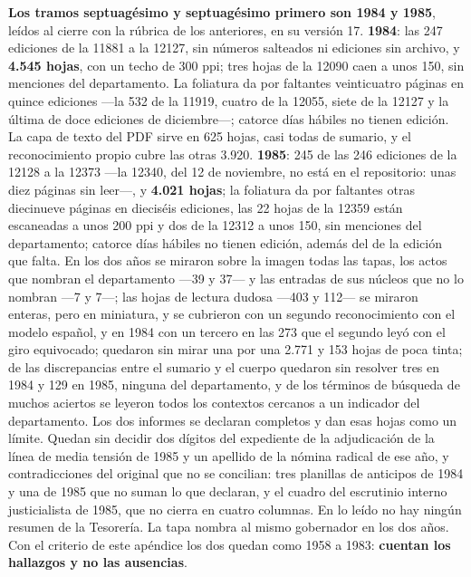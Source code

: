 \textbf{Los tramos septuagésimo y septuagésimo primero son 1984 y 1985}, leídos al cierre con la rúbrica de los anteriores, en su versión 17. \textbf{1984}: las 247 ediciones de la 11881 a la 12127, sin números salteados ni ediciones sin archivo, y \textbf{4.545 hojas}, con un techo de 300 ppi; tres hojas de la 12090 caen a unos 150, sin menciones del departamento. La foliatura da por faltantes veinticuatro páginas en quince ediciones ---la 532 de la 11919, cuatro de la 12055, siete de la 12127 y la última de doce ediciones de diciembre---; catorce días hábiles no tienen edición. La capa de texto del PDF sirve en 625 hojas, casi todas de sumario, y el reconocimiento propio cubre las otras 3.920. \textbf{1985}: 245 de las 246 ediciones de la 12128 a la 12373 ---la 12340, del 12 de noviembre, no está en el repositorio: unas diez páginas sin leer---, y \textbf{4.021 hojas}; la foliatura da por faltantes otras diecinueve páginas en dieciséis ediciones, las 22 hojas de la 12359 están escaneadas a unos 200 ppi y dos de la 12312 a unos 150, sin menciones del departamento; catorce días hábiles no tienen edición, además del de la edición que falta. En los dos años se miraron sobre la imagen todas las tapas, los actos que nombran el departamento ---39 y 37--- y las entradas de sus núcleos que no lo nombran ---7 y 7---; las hojas de lectura dudosa ---403 y 112--- se miraron enteras, pero en miniatura, y se cubrieron con un segundo reconocimiento con el modelo español, y en 1984 con un tercero en las 273 que el segundo leyó con el giro equivocado; quedaron sin mirar una por una 2.771 y 153 hojas de poca tinta; de las discrepancias entre el sumario y el cuerpo quedaron sin resolver tres en 1984 y 129 en 1985, ninguna del departamento, y de los términos de búsqueda de muchos aciertos se leyeron todos los contextos cercanos a un indicador del departamento. Los dos informes se declaran completos y dan esas hojas como un límite. Quedan sin decidir dos dígitos del expediente de la adjudicación de la línea de media tensión de 1985 y un apellido de la nómina radical de ese año, y contradicciones del original que no se concilian: tres planillas de anticipos de 1984 y una de 1985 que no suman lo que declaran, y el cuadro del escrutinio interno justicialista de 1985, que no cierra en cuatro columnas. En lo leído no hay ningún resumen de la Tesorería. La tapa nombra al mismo gobernador en los dos años. Con el criterio de este apéndice los dos quedan como 1958 a 1983: \textbf{cuentan los hallazgos y no las ausencias}.

